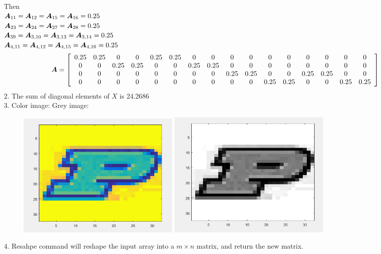 \documentclass{article}
\begin{document}
Then\\ $ \boldsymbol{A}_{11}= \boldsymbol{A}_{12}= \boldsymbol{A}_{15}= \boldsymbol{A}_{16} = 0.25 $\\
$ \boldsymbol{A}_{23}= \boldsymbol{A}_{24}= \boldsymbol{A}_{27}= \boldsymbol{A}_{28} = 0.25 $\\
$ \boldsymbol{A}_{39}= \boldsymbol{A}_{3,10}= \boldsymbol{A}_{3,13}= \boldsymbol{A}_{3,14} = 0.25 $\\
$ \boldsymbol{A}_{4,11}= \boldsymbol{A}_{4,12}= \boldsymbol{A}_{4,15}= \boldsymbol{A}_{4,16} = 0.25 $\\

\begin{equation*}\boldsymbol{A}=
\left[
\begin{array}{cccccccccccccccc}
0.25 & 0.25 & 0 & 0 & 0.25 & 0.25 & 0 & 0 & 0 & 0 & 0 & 0 & 0 & 0 & 0 & 0  \\
0 & 0 & 0.25 & 0.25 & 0 & 0 & 0.25 & 0.25 & 0 & 0 & 0 & 0 & 0 & 0 & 0 & 0  \\
0 & 0 & 0 & 0 & 0 & 0 & 0 & 0 & 0.25 & 0.25 & 0 & 0 & 0.25 & 0.25 & 0 & 0 \\
0 & 0 & 0 & 0 & 0 & 0 & 0 & 0 & 0 & 0 & 0.25 & 0.25 & 0 & 0 & 0.25 & 0.25 \\
\end{array}
\right]
\end{equation*}
2. The sum of diagonal elements of $X$ is 24.2686  \\

3.  Color image:  
Grey image: 
\begin{figure} [h]
\includegraphics[width=8cm]{color}
\includegraphics[width=8cm]{gray}
\end{figure}

4.  Resahpe command will reshape the input array into a $m\times n$ matrix, and return the new matrix. 
\end{document}
